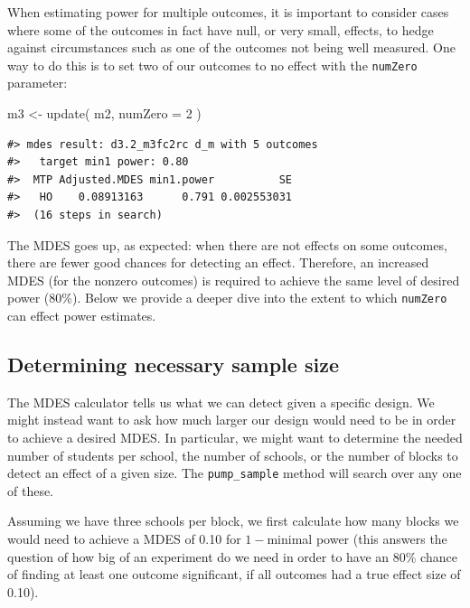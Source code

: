 \documentclass{article}
\newenvironment{Shaded}{\begin{snugshade}}{\end{snugshade}}
\newcommand{\AttributeTok}[1]{\textcolor[rgb]{0.77,0.63,0.00}{#1}}
\newcommand{\DecValTok}[1]{\textcolor[rgb]{0.00,0.00,0.81}{#1}}
\newcommand{\FunctionTok}[1]{\textcolor[rgb]{0.00,0.00,0.00}{#1}}
\newcommand{\NormalTok}[1]{#1}
\newcommand{\OtherTok}[1]{\textcolor[rgb]{0.56,0.35,0.01}{#1}}
\begin{document}
When estimating power for multiple outcomes, it is important to consider
cases where some of the outcomes in fact have null, or very small,
effects, to hedge against circumstances such as one of the outcomes not
being well measured. One way to do this is to set two of our outcomes to
no effect with the \texttt{numZero} parameter:

\begin{Shaded}
\begin{Highlighting}[]
\NormalTok{m3 }\OtherTok{\textless{}{-}} \FunctionTok{update}\NormalTok{( m2, }\AttributeTok{numZero =} \DecValTok{2}\NormalTok{ )}
\end{Highlighting}
\end{Shaded}

\begin{verbatim}
#> mdes result: d3.2_m3fc2rc d_m with 5 outcomes
#>   target min1 power: 0.80
#>  MTP Adjusted.MDES min1.power          SE
#>   HO    0.08913163      0.791 0.002553031
#>  (16 steps in search)
\end{verbatim}

The MDES goes up, as expected: when there are not effects on some
outcomes, there are fewer good chances for detecting an effect.
Therefore, an increased MDES (for the nonzero outcomes) is required to
achieve the same level of desired power (80\%). Below we provide a
deeper dive into the extent to which \texttt{numZero} can effect power
estimates.

\subsection{Determining necessary sample size}

The MDES calculator tells us what we can detect given a specific design.
We might instead want to ask how much larger our design would need to be
in order to achieve a desired MDES. In particular, we might want to
determine the needed number of students per school, the number of
schools, or the number of blocks to detect an effect of a given size.
The \texttt{pump\_sample} method will search over any one of these.

Assuming we have three schools per block, we first calculate how many
blocks we would need to achieve a MDES of 0.10 for \(1-\)minimal power
(this answers the question of how big of an experiment do we need in
order to have an 80\% chance of finding at least one outcome
significant, if all outcomes had a true effect size of 0.10).
\end{document}
